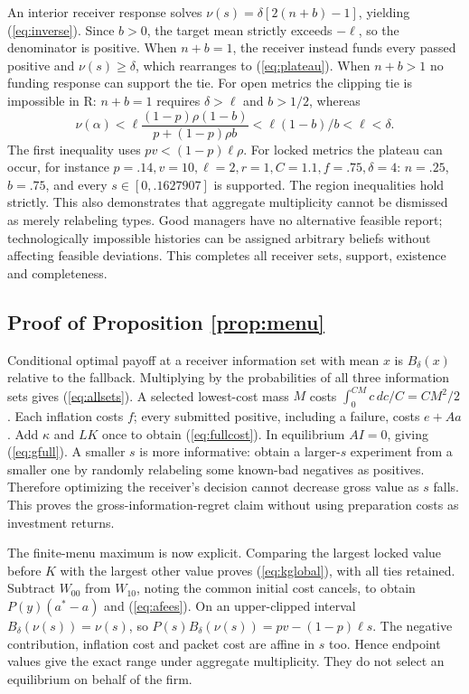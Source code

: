 \documentclass[11pt]{article}
\begin{document}
An interior receiver response solves $\nu(s)=\delta[2(n+b)-1]$, yielding (\ref{eq:inverse}). Since $b>0$, the target mean strictly exceeds $-\ell$, so the denominator is positive. When $n+b=1$, the receiver instead funds every passed positive and $\nu(s)\geq\delta$, which rearranges to (\ref{eq:plateau}). When $n+b>1$ no funding response can support the tie. For open metrics the clipping tie is impossible in R: $n+b=1$ requires $\delta>\ell$ and $b>1/2$, whereas
\[
\nu(\alpha)<\ell\frac{(1-p)\rho(1-b)}{p+(1-p)\rho b}<\ell(1-b)/b<\ell<\delta.
\]
The first inequality uses $pv<(1-p)\ell\rho$. For locked metrics the plateau can occur, for instance $p=.14,v=10,\ell=2,r=1,C=1.1,f=.75,\delta=4$: $n=.25$, $b=.75$, and every $s\in[0,.1627907]$ is supported. The region inequalities hold strictly. This also demonstrates that aggregate multiplicity cannot be dismissed as merely relabeling types. Good managers have no alternative feasible report; technologically impossible histories can be assigned arbitrary beliefs without affecting feasible deviations. This completes all receiver sets, support, existence and completeness.

\subsection{Proof of Proposition \ref{prop:menu}}\label{app:menu}
Conditional optimal payoff at a receiver information set with mean $x$ is $B_\delta(x)$ relative to the fallback. Multiplying by the probabilities of all three information sets gives (\ref{eq:allsets}). A selected lowest-cost mass $M$ costs $\int_0^{CM}c\,dc/C=CM^2/2$. Each inflation costs $f$; every submitted positive, including a failure, costs $e+Aa$. Add $\kappa$ and $LK$ once to obtain (\ref{eq:fullcost}). In equilibrium $AI=0$, giving (\ref{eq:gfull}). A smaller $s$ is more informative: obtain a larger-$s$ experiment from a smaller one by randomly relabeling some known-bad negatives as positives. Therefore optimizing the receiver's decision cannot decrease gross value as $s$ falls. This proves the gross-information-regret claim without using preparation costs as investment returns.

The finite-menu maximum is now explicit. Comparing the largest locked value before $K$ with the largest other value proves (\ref{eq:kglobal}), with all ties retained. Subtract $W_{00}$ from $W_{10}$, noting the common initial cost cancels, to obtain $P(y)(a^*-a)$ and (\ref{eq:afees}). On an upper-clipped interval $B_\delta(\nu(s))=\nu(s)$, so $P(s)B_\delta(\nu(s))=pv-(1-p)\ell s$. The negative contribution, inflation cost and packet cost are affine in $s$ too. Hence endpoint values give the exact range under aggregate multiplicity. They do not select an equilibrium on behalf of the firm.
\end{document}
